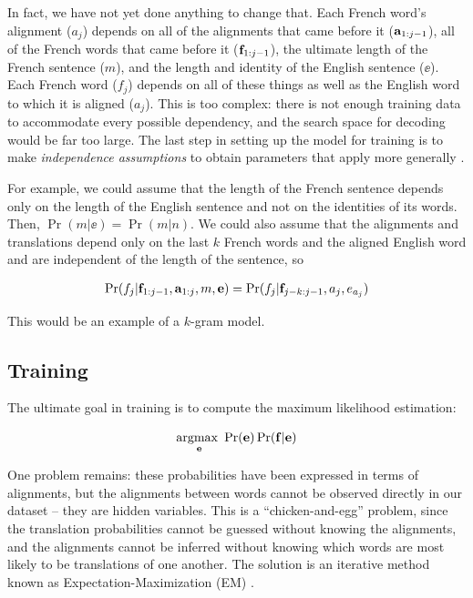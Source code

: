 \documentclass[11pt]{article}
\begin{document}
In fact, we have not yet done anything to change that.
Each French word's alignment ($a_j$) depends on all of the alignments that came before it ($\aa_{1:j-1}$), 
all of the French words that came before it ($\ff_{1:j-1}$),
the ultimate length of the French sentence ($m$), and the length and identity of the English sentence ($\ee$).
Each French word ($f_j$) depends on all of these things as well as the English word to which it is aligned ($a_j$).
This is too complex: there is not enough training data to accommodate every possible dependency, and the 
search space for decoding would be far too large.
The last step in setting up the model for training is to make
\textit{independence assumptions} to obtain parameters that apply more generally \cite{lopez}.

For example, we could assume that the length of the French sentence depends only on the length of the English sentence
and not on the identities of its words. Then, $\Pr(m | \ee) = \Pr(m | n)$. We could also assume that the alignments
and translations depend only on the last $k$ French words and the aligned English word and are independent of the length of the sentence, so

\begin{align*}
    \Pr(f_j |\ff_{1:j-1}, \aa_{1:j}, m, \ee) = \Pr(f_j | \ff_{j-k:j-1}, a_j, e_{a_j})
\end{align*}

This would be an example of a $k$-gram model.

\subsection{Training} \label{training}
The ultimate goal in training is to compute the maximum likelihood estimation:

\[
\argmax_{\ee} \Pr(\ee) \Pr(\ff | \ee)
\]

One problem remains: these probabilities have been expressed in terms of alignments, but the alignments between words 
cannot be observed directly in our dataset -- they are hidden variables.
This is a ``chicken-and-egg'' problem, since the translation probabilities cannot be guessed without knowing
the alignments, and the alignments cannot be inferred without knowing which words are most likely to be
translations of one another.
The solution is an iterative method known as Expectation-Maximization (EM) \cite{brown:93}.
\end{document}

